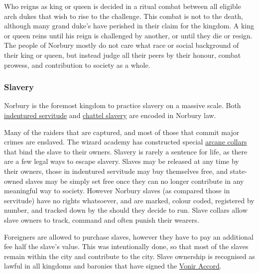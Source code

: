 Who reigns as king or queen is decided in a ritual combat between all eligible
arch dukes that wish to rise to the challenge. This combat is not to the
death, although many grand duke's have perished in their claim for the
kingdom. A king or queen reins until his reign is challenged by another, or
until they die or resign. The people of Norbury mostly do not care what race
or social background of their king or queen, but instead judge all their peers
by their honour, combat prowess, and contribution to society as a whole.

\subsubsection{Slavery}
\label{sec:Slavery in Norbury}

Norbury is the foremost kingdom to practice slavery on a massive scale. Both
\hyperref[sec:Indentured Servitude]{indentured servitude} and
\hyperref[sec:Unregulated Slavery]{chattel slavery} are encoded in Norbury
law.

Many of the raiders that are captured, and most of those that commit major
crimes are enslaved. The wizard academy has constructed special
\hyperref[sec:Slave Band]{arcane collars} that bind the slave to their
owners. Slavery is rarely a sentence for life, as there are a few legal ways to
escape slavery. Slaves may be released at any time by their owners, those in
indentured servitude may buy themselves free, and state-owned slaves may be
simply set free once they can no longer contribute in any meaningful way to
society. However Norbury slaves (as compared those in servitude) have no
rights whatsoever, and are marked, colour coded, registered by number, and
tracked down by the  should they decide to
run. Slave collars allow slave owners to track, command and often punish their
wearers.

Foreigners are allowed to purchase slaves, however they have to pay an
additional fee half the slave's value. This was intentionally done, so that
most of the slaves remain within the city and contribute to the city. Slave
ownership is recognised as lawful in all kingdoms and baronies that have
signed the \hyperref[sec:Vonir Accord]{Vonir Accord}.

